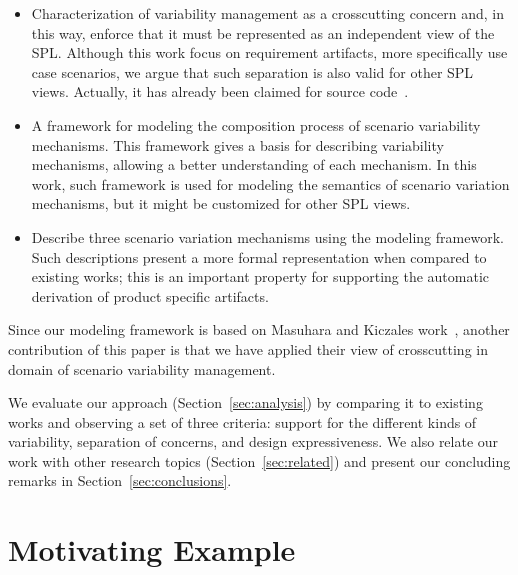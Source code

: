 \documentclass{acm_proc_article-sp}
\begin{document}
\begin{itemize}

\item Characterization of variability management as a crosscutting concern and, in this way, enforce that it  
must be represented as an independent view of the SPL. Although this work focus on requirement artifacts, 
more specifically use case scenarios, we argue that such separation is also valid for other SPL views. Actually,
it has already been claimed for source code~\cite{alves-gpce-06,mmedeiros-lawasp-2007}.
  
\item A framework for modeling the composition process of scenario variability mechanisms. 
This framework gives a basis for describing variability mechanisms, 
allowing a better understanding of each mechanism. In this work, such framework is used for modeling 
the semantics of scenario variation mechanisms, but it might be customized for other SPL views.

\item Describe three scenario variation mechanisms using the
modeling framework. Such descriptions present
a more formal representation when compared to existing works; this is an
important property for supporting the automatic derivation of product
specific artifacts.

\end{itemize}

Since our modeling framework is based on Masuhara and Kiczales work~\cite{kiczales-ecoop-2003}, another 
contribution of this paper is that we have applied their view of crosscutting in domain of scenario 
variability management.

We evaluate our approach (Section~\ref{sec:analysis}) by comparing it 
to existing works and observing a set of three criteria: support for the 
different kinds of variability, separation of concerns, and design expressiveness.  We 
also relate our work with other research topics (Section~\ref{sec:related}) and present our concluding 
remarks in Section~\ref{sec:conclusions}.

\section{Motivating Example}
\label{sec:example}
\end{document}
